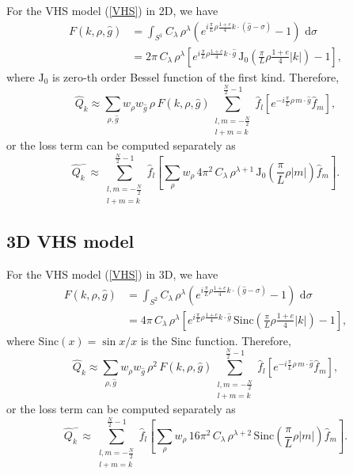 \documentclass[review, times]{elsarticle}
\newcommand{\rd}{\,\mathrm{d}}
\begin{document}
For the VHS model (\ref{VHS}) in 2D, we have
\begin{align}
 F(k,\rho,\hat{g})&= \int_{S^1}C_{\lambda}\,\rho^{\lambda}\left(e^{i\frac{\pi}{L} \rho \frac{1+e}{4}k\cdot (\hat{g}-\sigma)}-1\right)\,\rd{\sigma}\nonumber\\
 &=2\pi \,C_{\lambda}\,\rho^{\lambda}\left[ e^{i\frac{\pi}{L}\rho \frac{1+e}{4}k\cdot \hat{g}}\,\text{J}_0\left(\frac{\pi}{L}\rho \frac{1+e}{4}|k|\right)-1\right],
\end{align}
where $\text{J}_0$ is zero-th order Bessel function of the first kind. Therefore,
\begin{equation} \label{full}
  \hat{Q}_k\approx\sum_{\rho,\hat{g}}w_{\rho}w_{\hat{g}}\,\rho \,F(k,\rho,\hat{g})\sum_{\substack{l,m=-\frac{N}{2}\\l+m=k}}^{\frac{N}{2}-1}\hat{f}_l \left[e^{-i\frac{\pi}{L}\rho\, m \cdot \hat{g}}\hat{f}_m\right],
\end{equation} 
or the loss term can be computed separately as
\begin{equation} \label{separate}
\hat{Q}_k^-\approx\sum_{\substack{l,m=-\frac{N}{2}\\l+m=k}}^{\frac{N}{2}-1}\hat{f}_l \left[\sum_{\rho}w_{\rho}\,4\pi^2\, C_{\lambda}\,\rho^{\lambda+1}\, \text{J}_0\left(\frac{\pi}{L}\rho |m|\right)\hat{f}_m\right].
\end{equation}

\subsection{3D VHS model}

For the VHS model (\ref{VHS}) in 3D, we have
\begin{align}
  F(k,\rho,\hat{g})&=\int_{S^2}C_{\lambda}\,\rho^{\lambda}\left(e^{i\frac{\pi}{L}\rho \frac{1+e}{4}k\cdot (\hat{g}-\sigma)}-1\right)\,\rd{\sigma}\nonumber\\
  &=4\pi \,C_{\lambda}\,\rho^{\lambda}\left[ e^{i\frac{\pi}{L}\rho \frac{1+e}{4}k\cdot \hat{g}}\,\text{Sinc}\left(\frac{\pi}{L}\rho\frac{1+e}{4}|k|\right)-1\right],
\end{align}
where $\text{Sinc}(x)=\sin x/x$ is the Sinc function. Therefore,
\begin{equation} 
\hat{Q}_k\approx\sum_{\rho,\hat{g}}w_{\rho}w_{\hat{g}}\, \rho^2\,F(k,\rho,\hat{g})\sum_{\substack{l,m=-\frac{N}{2}\\l+m=k}}^{\frac{N}{2}-1}\hat{f}_l \left[e^{-i\frac{\pi}{L}\rho \,m \cdot \hat{g}}\hat{f}_m\right],
\end{equation} 
or the loss term can be computed separately as
\begin{equation} \label{separate3}
\hat{Q}_k^-\approx\sum_{\substack{l,m=-\frac{N}{2}\\l+m=k}}^{\frac{N}{2}-1}\hat{f}_l \left[\sum_{\rho}w_{\rho}\,16\pi^2 \,C_{\lambda}\,\rho^{\lambda+2} \,\text{Sinc}\left(\frac{\pi}{L}\rho |m|\right)\hat{f}_m\right].
\end{equation}
\end{document}
